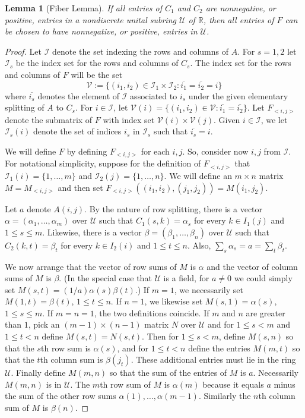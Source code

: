 \documentclass{amsart}
\newtheorem{lemma}[theorem]{Lemma}
\theoremstyle{definition}
\theoremstyle{remark}
\numberwithin{equation}{section}
\begin{document}
{\begin{lemma}[Fiber Lemma]
If all entries of $C_1$ and $C_2$ are nonnegative, or  positive, entries 
in a nondiscrete unital subring $\mathcal U$ of $\mathbb R$, 
then all entries of $F$ can 
be chosen to have nonnegative, or positive, entries in $\mathcal U$. 
\end{lemma} 
\begin{proof} 
Let $\mathcal I$ denote the set indexing the rows and columns of $A$. 
For $s=1,2$ let $\mathcal I_s$ be the index set for the rows and 
columns of $C_s$. The index set for the rows and columns of $F$ will 
be the set 
\[
\mathcal V:= \{(i_1,i_2)\in \mathcal I_1 \times \mathcal I_2: 
\overline{i_1}=
\overline{i_2}=i \} 
\]
where $\overline{i_s}$ denotes the element of $\mathcal I$ associated 
to $i_s$ under the given elementary splitting of $A$ to $C_s$. 
For $i\in \mathcal I$, let $\mathcal V(i)=\{(i_1,i_2)\in \mathcal V: 
\overline{i_1}=\overline{i_2}\}$. 
Let $F_{<i,j>}$ denote the 
submatrix of $F$ with index set 
$\mathcal V(i)\times \mathcal V(j)$. 
Given $i\in \mathcal I$, we let $\mathcal I_s(i)$ denote the set of indices 
$i_s$ in $\mathcal I_s$ such that $\overline{i_s}=i$. 

We will define $F$ by defining 
$F_{<i,j>}$ for each $i,j$. 
So, consider now $i,j$ from $\mathcal I$.
For notational simplicity, suppose 
for the definition of $F_{<i,j>}$ that 
$\mathcal I_1(i)=\{1,\dots ,m\}$ and 
$\mathcal I_2(j)=\{1,\dots ,n\}$.
We will define an $m\times n$ matrix $M=M_{<i,j>}$ 
and then set 
$F_{<i,j>}((i_1,i_2),(j_1,j_2))= M(i_1,j_2)$. 

Let $a$ denote $A(i,j)$.   By the nature of row splitting, 
there is a vector $\alpha=(\alpha_1, \dots ,\alpha_m)$ over 
$\mathcal U$ such that $C_1(s,k)=\alpha_s$ for every $k\in 
I_1(j)$ and $1\leq s \leq m$. Likewise, 
there is a vector $\beta=(\beta_1, \dots ,\beta_n)$ over 
$\mathcal U$ such that $C_2(k,t)=\beta_t$ for every $k\in 
I_2(i)$  and $1\leq t \leq n$. Also, 
$\sum_s \alpha_s = a = \sum_t\beta_t$. 

We now arrange that the vector of row sums of $M$ is $\alpha$ and the vector of 
column sums of $M$ is $\beta$. 
(In the special case that $\mathcal U$ is a field, for 
$a\neq 0$ we could simply set 
$M(s,t)=(1/a) \alpha (s) \beta (t)$.) 
If $m=1$, we necessarily set $M(1,t)= \beta(t)$, $1\leq t \leq n$.  
If $n=1$, we likewise set  $M(s,1)= \alpha(s)$, $1\leq s \leq m$. 
If $m=n=1$, the two definitions coincide. 
If $m$ and $n$ are greater than $1$, 
pick an $(m-1)\times (n-1)$ matrix $N$ over $\mathcal U$
and for $1\leq s<m$ and $1\leq t <n$ define 
$M(s,t) =N(s,t)$. Then for $1\leq s < m$, 
define $M(s,n)$ so that the $s$th row sum is 
$\alpha (s)$, and 
for $1\leq t < n$ 
define the entries $M(m,t)$ so that the $t$th column sum is 
$\beta (j_t)$. These additional entries must lie in 
the ring $\mathcal U$. 
 Finally define  $M(m,n)$ so that the sum of 
the entries of $M$ is $a$. Necessarily $M(m,n)$ is in $\mathcal U$. 
The $m$th row sum of $M$ is $\alpha(m)$ because it equals 
$a$ minus the sum of the other row sums $\alpha(1), \dots , 
\alpha(m-1)$. Similarly the $n$th column sum of $M$ is $\beta(n)$. 


\end{proof}}
\end{document}

